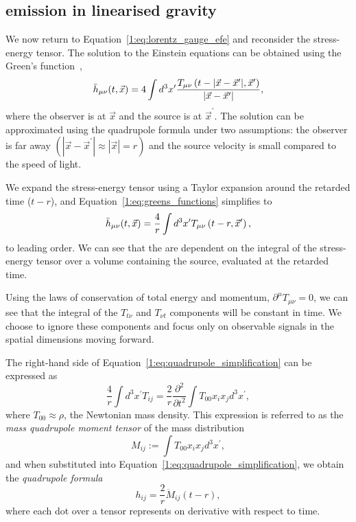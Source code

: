 \subsection{\label{1:sec:gw-emission}\Gwadj emission in linearised gravity}

We now return to Equation~\ref{1:eq:lorentz_gauge_efe} and reconsider the stress-energy tensor. The solution to the Einstein equations can be obtained using the Green's function~\cite{Dhurkunde:2024},
%
\begin{equation}
    \Bar{h}_{\mu\nu}(t, \vec{x}) = 4 \int d^3 x^{\prime} \frac{T_{\mu\nu}\left(t - |\vec{x} - \vec{x}^{\prime}|, \vec{x}^{\prime}\right)}{|\vec{x} - \vec{x}^{\prime}|},
    \label{1:eq:greens_functions}
\end{equation}
%
where the observer is at $\vec{x}$ and the source is at $\vec{x}^{\prime}$. The solution can be approximated using the quadrupole formula under two assumptions: the observer is far away $\left(|\vec{x} - \vec{x}^{\prime}| \approx |\vec{x}| = r\right)$ and the source velocity is small compared to the speed of light. 

We expand the stress-energy tensor using a Taylor expansion around the retarded time ($t - r$), and Equation~\ref{1:eq:greens_functions} simplifies to
%
\begin{equation}
    \Bar{h}_{\mu\nu}(t, \vec{x}) = \frac{4}{r} \int d^3 x^{\prime} T_{\mu\nu}\left(t - r, \vec{x}^{\prime}\right),
    \label{1:eq:quadrupole_simplification}
\end{equation}
%
to leading order. We can see that the \gws are dependent on the integral of the stress-energy tensor over a volume containing the source, evaluated at the retarded time.

Using the laws of conservation of total energy and momentum, $\partial^{\mu}T_{\mu\nu}=0$, we can see that the integral of the $T_{t\nu}$ and $T_{\nu t}$ components will be constant in time. We choose to ignore these components and focus only on observable signals in the spatial dimensions moving forward.

The right-hand side of Equation~\ref{1:eq:quadrupole_simplification} can be expressed as
%
\begin{equation}
    \frac{4}{r} \int d^3 x^{\prime} T_{ij} = \frac{2}{r}\frac{\partial^{2}}{\partial t^{2}} \int T_{00} x_{i} x_{j} d^{3} x^{\prime},
\end{equation}
%
where $T_{00} \approx \rho$, the Newtonian mass density. This expression is referred to as the \textit{mass quadrupole moment tensor} of the mass distribution
%
\begin{equation}
    M_{ij} := \int T_{00} x_{i} x_{j} d^{3} x^{\prime},
    \label{1:eq:quadrupole_moment_tensor}
\end{equation}
%
and when substituted into Equation~\ref{1:eq:quadrupole_simplification}, we obtain the \textit{quadrupole formula}
%
\begin{equation}
    h_{ij} = \frac{2}{r} \ddot{M}_{ij}(t-r),
    \label{1:eq:quadrupole_formula}
\end{equation}
%
where each dot over a tensor represents on derivative with respect to time.

